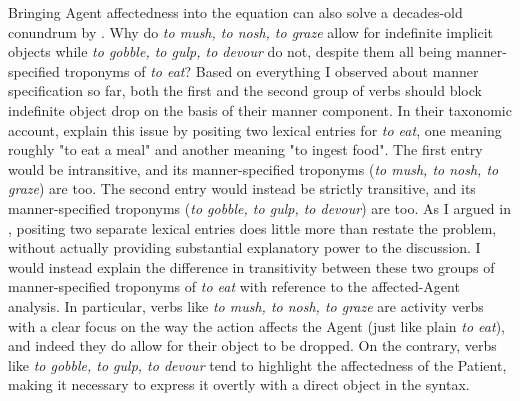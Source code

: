 Bringing Agent affectedness into the equation can also solve a decades-old conundrum by \textcite{FellbaumKegl1989taxonomic}. Why do \textit{to mush, to nosh, to graze} allow for indefinite implicit objects while \textit{to gobble, to gulp, to devour} do not, despite them all being manner-specified troponyms of \textit{to eat}? Based on everything I observed about manner specification so far, both the first and the second group of verbs should block indefinite object drop on the basis of their manner component. In their taxonomic account, \textcite{FellbaumKegl1989taxonomic} explain this issue by positing two lexical entries for \textit{to eat}, one meaning roughly "to eat a meal" and another meaning "to ingest food". The first entry would be intransitive, and its manner-specified troponyms (\textit{to mush, to nosh, to graze}) are too. The second entry would instead be strictly transitive, and its manner-specified troponyms (\textit{to gobble, to gulp, to devour}) are too. As I argued in , positing two separate lexical entries does little more than restate the problem, without actually providing substantial explanatory power to the discussion. I would instead explain the difference in transitivity between these two groups of manner-specified troponyms of \textit{to eat} with reference to the affected-Agent analysis. In particular, verbs like \textit{to mush, to nosh, to graze} are activity verbs with a clear focus on the way the action affects the Agent (just like plain \textit{to eat}), and indeed they do allow for their object to be dropped. On the contrary, verbs like \textit{to gobble, to gulp, to devour} tend to highlight the affectedness of the Patient, making it necessary to express it overtly with a direct object in the syntax.\\
